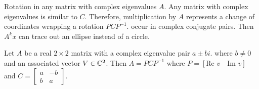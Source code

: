 \begin{card}
\begin{compactdesc}
    \item[Rotation in any matrix] with complex eigenvalues $A$.
        Any matrix with complex eigenvalues is similar to $C$.
        Therefore, multiplication by $A$ represents a change of coordinates
        wrapping a rotation $PCP^{-1}$.
        occur in complex conjugate pairs.
        Then $A^kx$ can trace out an ellipse instead of a circle.
    \end{compactdesc}
    \begin{theorem}
    Let $A$ be a real $2\times2$ matrix with a complex eigenvalue pair $a \pm bi$.
    where $b \neq 0$ and an associated vector $V \in \mathbb{C}^2$.
    Then $A = PCP^{-1}$ where $P = [\text{Re } v \quad \text{Im } v]$
    and $C = \left[\begin{smallmatrix}a & -b \\ b & a\end{smallmatrix}\right]$.
    \end{theorem}
\end{card}


